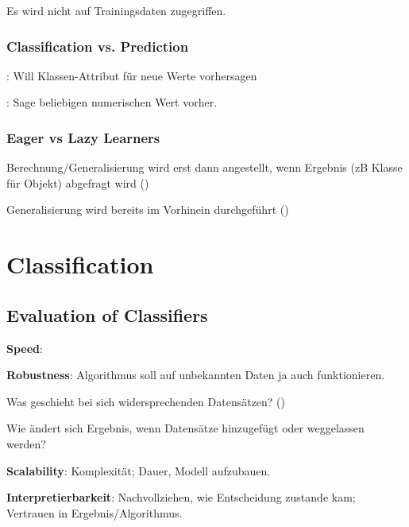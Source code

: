 \documentclass[10pt]{article} %
\begin{document}
\begin{definition} 
  Es wird nicht auf Trainingsdaten zugegriffen. 
\end{definition} 

\subsubsection{Classification vs. Prediction}

\begin{cptitemize}
\item \textbf{}: Will Klassen-Attribut für neue Werte
  vorhersagen
\item \textbf{}: Sage beliebigen numerischen Wert vorher.
\end{cptitemize}


\subsubsection{Eager vs Lazy Learners}
\begin{definition}
  Berechnung/Generalisierung wird erst dann angestellt, wenn Ergebnis (zB Klasse für Objekt)
  abgefragt wird ()
\end{definition}
\begin{definition}
  Generalisierung wird bereits im Vorhinein durchgeführt ()
\end{definition}
\section{Classification}

\subsection{Evaluation of Classifiers}
\begin{cptitemize} 
        \item \textbf{Speed}: 
        \item \textbf{Robustness}: Algorithmus soll auf unbekannten Daten ja auch funktionieren.
        \begin{cptitemize} 
                 \item Was geschieht bei sich widersprechenden Datensätzen? () 
                 \item Wie ändert sich Ergebnis, wenn Datensätze hinzugefügt oder weggelassen werden?
         \end{cptitemize}  
       \item \textbf{Scalability}: Komplexität; Dauer, Modell aufzubauen. 
       \item \textbf{Interpretierbarkeit}: Nachvollziehen, wie Entscheidung zustande kam; Vertrauen in Ergebnis/Algorithmus.
\end{cptitemize} 
\end{document}
